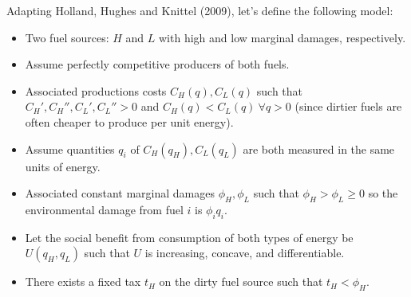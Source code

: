 \documentclass[12pt]{article}
\begin{document}
\def\qis{q_i^*} \def\qiss{q_i^{**}}

Adapting Holland, Hughes and Knittel (2009), let's define the following model:
\begin{itemize}
    \item Two fuel sources: $H$ and $L$ with high and low marginal damages, respectively.
    \item Assume perfectly competitive producers of both fuels.
    \item Associated productions costs $C_H(q), C_L(q)$ such that $C_H', C_H'', C_L', C_L''>0$ and $C_H(q)<C_L(q)\ \forall q>0$ (since dirtier fuels are often cheaper to produce per unit energy).
    \item Assume quantities $q_i$ of $C_H(q_H), C_L(q_L)$ are both measured in the same units of energy.
    \item Associated constant marginal damages $\phi_H, \phi_L$ such that $\phi_H>\phi_L\geq0$ so the environmental damage from fuel $i$ is $\phi_i q_i$.
    \item Let the social benefit from consumption of both types of energy be $U(q_H, q_L)$ such that $U$ is increasing, concave, and differentiable.
    \item There exists a fixed tax $t_H$ on the dirty fuel source such that $t_H < \phi_H$.
\end{itemize}
\end{document}
